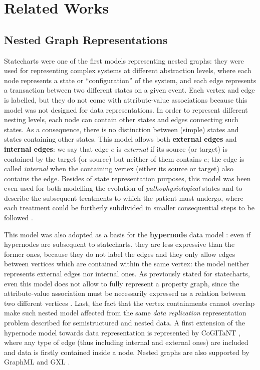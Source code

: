 \section{Related Works}

\subsection{Nested Graph Representations}
Statecharts \cite{statecharts} were one of the first models representing nested graphs: they were used for representing complex systems at different abstraction levels, where each node represents a  state or ``configuration'' of the system, and each edge represents a transaction between two different states on a given event. Each vertex and edge is labelled, but  they do  not come with attribute-value associations because this model was not designed for data representations. In order to represent different nesting levels, each node can contain other states and edges connecting such states. As a consequence,  there is no distinction between (simple) states and states containing other states.
This model allows both \textbf{external edges} and \textbf{internal edges}: we say that edge $e$ is \textit{external} if its source (or target) is contained by the target (or source) but neither of them contains $e$; the edge is called \textit{internal} when the containing vertex (either its source or target) also contains the edge. Besides of state representation purposes, this model was been even used for both modelling the evolution of \textit{pathophysiological} states and to describe the subsequent treatments to which the patient must undergo, where each treatment could be furtherly subdivided in smaller consequential steps to be followed \cite{NestedGlaucoma}.

This model was also adopted as a basis for the \textbf{hypernode} data model \cite{Poulovassilis1994}: even if hypernodes are subsequent to statecharts, they are less expressive than the former ones, because they do not label the edges and they only allow edges between vertices which are contained within the same vertex: the model neither represents external edges nor internal ones. As previously stated for statecharts, even this model does not allow to fully represent a property graph, since the attribute-value association must be necessarily expressed as a relation between two different vertices \cite{Poulovassilis1994}. Last, the fact that the vertex containments cannot overlap make such nested model affected from the same \textit{data replication} representation problem described for semistructured and nested data. A first extension of the hypernode model towards data representation is represented by CoGITaNT \cite{GenestS98}, where any type of edge (thus including internal and external ones) are included and data is firstly contained inside a node. Nested graphs are also supported by GraphML \cite{graphml} and GXL \cite{GXL}.

